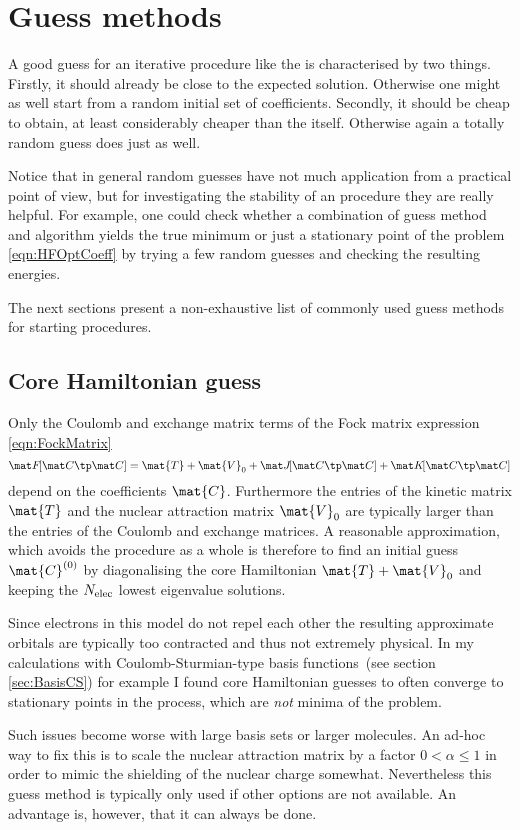 \section{Guess methods}
\label{sec:ScfGuesses}
A good guess for an iterative procedure like the \SCF
is characterised by two things.
Firstly, it should already be close to the expected solution.
Otherwise one might as well start from a random initial set of coefficients.
Secondly, it should be cheap to obtain,
at least considerably cheaper than the \SCF itself.
Otherwise again a totally random guess does just as well.

Notice that in general random guesses have not much application
from a practical point of view,
but for investigating the stability of an \SCF procedure
they are really helpful.
For example, one could check whether a combination of guess method
and \SCF algorithm yields the true minimum or just a stationary
point of the \HF problem \eqref{eqn:HFOptCoeff}
by trying a few random guesses and checking the resulting energies.

The next sections present a non-exhaustive list of
commonly used guess methods for starting \SCF procedures.

\subsection{Core Hamiltonian guess}
\label{sec:CoreHamiltonian}
Only the Coulomb and exchange matrix terms of the Fock matrix
expression \eqref{eqn:FockMatrix}
\[ \matFfull = \mat{T} + \mat{V}_0 + \matJfull + \matKfull \]
depend on the coefficients $\mat{C}$.
Furthermore the entries of the kinetic matrix $\mat{T}$
and the nuclear attraction matrix $\mat{V}_0$
are typically larger than the entries of the Coulomb and exchange matrices.
A reasonable approximation,
which avoids the \SCF procedure as a whole
is therefore to find an initial guess $\mat{C}^{(0)}$
by diagonalising the core Hamiltonian $\mat{T} + \mat{V}_0$
and keeping the $N_\text{elec}$ lowest eigenvalue solutions.

Since electrons in this model do not repel each other
the resulting approximate orbitals are typically too contracted
and thus not extremely physical.
In my calculations with Coulomb-Sturmian-type
basis functions~(see section \ref{sec:BasisCS})
for example I found core Hamiltonian guesses to often
converge to stationary points in the \SCF process,
which are \emph{not} minima of the \HF problem.

Such issues become worse with large basis sets or larger molecules.
An ad-hoc way to fix this is to scale the nuclear attraction
matrix by a factor $0 < \alpha \leq 1$
in order to mimic the shielding of the nuclear charge somewhat.
Nevertheless this guess method is typically only used
if other options are not available.
An advantage is, however, that it can always be done.

